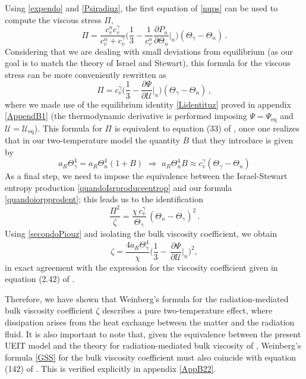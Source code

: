 \documentclass[a4paper, amsfonts, amssymb, amsmath, reprint, twocolumn, showkeys, nofootinbib]{revtex4-2}
\begin{document}
Using \eqref{expendo} and \eqref{Psiradiuz}, the first equation of \eqref{nups} can be used to compute the viscous stress $\Pi$, 
\begin{equation}
\Pi = \dfrac{c_v^n c_v^\gamma}{c_v^n + c_v^\gamma} \bigg( \dfrac{1}{3} - \dfrac{1}{c_v^n} \dfrac{\partial P_n}{\partial \Theta_n} \bigg|_n  \bigg) (\Theta_\gamma - \Theta_n) \, .
\end{equation}
Considering that we are dealing with small deviations from equilibrium (as our goal is to match the theory of Israel and Stewart), this formula for the viscous stress can be more conveniently rewritten as 
\begin{equation}\label{secondoPiouz}
\Pi = c_v^\gamma \bigg(\dfrac{1}{3} -  \dfrac{\partial \Psi}{\partial \mathcal{U}} \bigg|_n   \bigg) (\Theta_\gamma - \Theta_n) \,  ,
\end{equation}
where we made use of the equilibrium identity \eqref{Lidentituz} proved in appendix \ref{AppendB1} (the thermodynamic derivative is performed imposing $\Psi=\Psi_{\text{eq}}$ and $\mathcal{U}=\mathcal{U}_{\text{eq}}$). This formula for $\Pi$ is equivalent to equation (33) of \citet{UdeyIsrael1982}, once one realizes that in our two-temperature model the quantity $B$ that they introduce is given by
\begin{equation}
    a_R \Theta_\gamma^4 = a_R \Theta_n^4(1+B)  \, \,  \Rightarrow  \, \,  a_R \Theta_n^4 B \approx c_v^\gamma (\Theta_\gamma - \Theta_n)
\end{equation}
As a final step, we need to impose the equivalence between the Israel-Stewart entropy production \eqref{quandoIsrproduceentrop} and our formula \eqref{quandoiorpprodent}; this leads us to the identification
\begin{equation}
\dfrac{\Pi^2}{\zeta} = \dfrac{\chi \, c_v^\gamma}{\Theta_\gamma} \,  (\Theta_n - \Theta_\gamma)^2 \, .
\end{equation}
Using \eqref{secondoPiouz} and isolating the bulk viscosity coefficient, we obtain
\begin{equation}\label{GSS}
\zeta = \dfrac{4 a_R \Theta_\gamma^4}{\chi} \bigg( \dfrac{1}{3} - \, \dfrac{\partial \Psi}{\partial \mathcal{U}} \bigg|_n   \bigg)^2,
\end{equation}
in exact agreement with the expression for the viscosity coefficient given in equation (2.42) of \citet{Weinberg1971}. 

Therefore, we have shown that Weinberg's formula for the radiation-mediated bulk viscosity coefficient $\zeta$ describes a pure two-temperature effect, where dissipation arises from the heat exchange between the matter and the radiation fluid. It is also important to note that, given the equivalence between the present UEIT model and the theory for radiation-mediated bulk viscosity of \citet{GavassinoRadiazione}, Weinberg's formula \eqref{GSS} for the bulk viscosity coefficient must also coincide with equation (142) of \citet{GavassinoRadiazione}. This is verified explicitly in appendix \ref{AppB22}.
\end{document}
